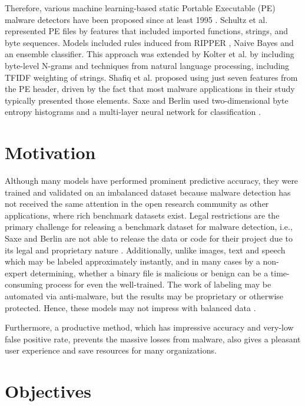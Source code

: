 Therefore, various machine learning-based static Portable Executable (PE) malware detectors have been proposed since at least 1995 \cite{kephart1995biologically}. Schultz et al. \cite{schultz2001data} represented PE files by features that included imported functions, strings, and byte sequences. Models included rules induced from RIPPER \cite{cohen1995fast}, Naive Bayes and an ensemble classifier. This approach was extended by Kolter et al. \cite{kolter2006learning} by including byte-level N-grams and techniques from natural language processing, including TFIDF weighting of strings. Shafiq et al. \cite{Shafiq2009AFF} proposed using just seven features from the PE header, driven by the fact that most malware applications in their study typically presented those elements. Saxe and Berlin used two-dimensional byte entropy histograms and a multi-layer neural network for classification \cite{saxe2015deep}.

\section{Motivation}
\label{sec:motivation}

Although many models have performed prominent predictive accuracy, they were trained and validated on an imbalanced dataset because malware detection has not received the same attention in the open research community as other applications, where rich benchmark datasets exist. Legal restrictions are the primary challenge for releasing a benchmark dataset for malware detection, i.e., Saxe and Berlin are not able to release the data or code for their project due to its legal and proprietary nature \cite{saxe2015deep}. Additionally, unlike images, text and speech which may be labeled approximately instantly, and in many cases by a non-expert determining, whether a binary file is malicious or benign can be a time-consuming process for even the well-trained. The work of labeling may be automated via anti-malware, but the results may be proprietary or otherwise protected. Hence, these models may not impress with balanced data \cite{chawla2009data}.

Furthermore, a productive method, which has impressive accuracy and very-low false positive rate, prevents the massive losses from malware, also gives a pleasant user experience and save resources for many organizations.

\section{Objectives}
\label{sec:objectives}

